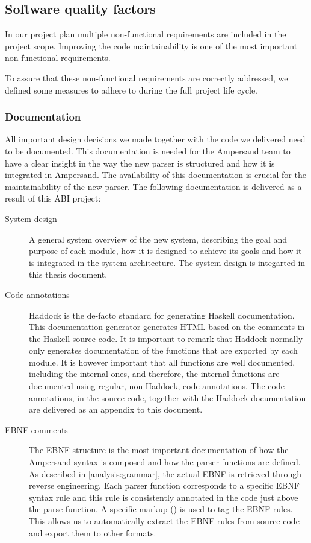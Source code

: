 
\subsection{Software quality factors}
\label{design:software-quality}
In our project plan  multiple non-functional requirements are included in the project scope.
Improving the code maintainability is one of the most important non-functional requirements.

To assure that these non-functional requirements are correctly addressed, we defined some measures to adhere to during the full project life cycle.

\subsubsection{Documentation}
All important design decisions we made together with the code we delivered need to be documented.
This documentation is needed for the Ampersand team to have a clear insight in the way the new parser is structured and how it is integrated in Ampersand.
The availability of this documentation is crucial for the maintainability of the new parser.
The following documentation is delivered as a result of this ABI project:
%
\begin{description}
  \item[System design]
    A general system overview of the new system, describing the goal and purpose of each module, how it is designed to achieve its goals and how it is integrated in the system architecture.
   The system design is integarted in this thesis document.
  \item[Code annotations]
    Haddock is the de-facto standard for generating Haskell documentation. 
    This documentation generator generates HTML based on the comments in the Haskell source code.
    It is important to remark that Haddock normally only generates documentation of the functions that are exported by each module.
    It is however important that all functions are well documented, including the internal ones, and therefore, the internal functions are documented using regular, non-Haddock, code annotations.
    The code annotations, in the source code, together with the Haddock documentation are delivered as an appendix to this document.
  \item[EBNF comments]
    The EBNF structure is the most important documentation of how the Ampersand syntax is composed and how the parser functions are defined.
    As described in \autoref{analysis:grammar}, the actual EBNF is retrieved through reverse engineering.
    Each parser function corresponds to a specific EBNF syntax rule and this rule is consistently annotated in the code just above the parse function.
  A specific markup (\code{------}) is used to tag the EBNF rules.
  This allows us to automatically extract the EBNF rules from source code and export them to other formats.
\end{description}

